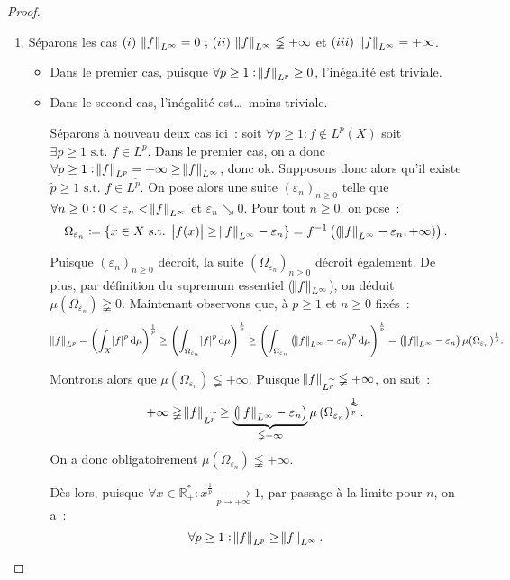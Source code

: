 \documentclass{article}
\theoremstyle{definition}
\newcommand{\pinfty}{{+\infty}}
\newcommand{\st}{\text{ s.t. }}
\newcommand{\R}{{\mathbb R}}
\begin{document}
\begin{proof}~
\begin{enumerate}
	\item Séparons les cas $(i)~\norm f_{L^\infty} = 0~; \, (ii)~\norm f_{L^\infty} \lneqq \pinfty$ et $(iii)~\norm f_{L^\infty} = \pinfty$.
	\begin{itemize}
		\item Dans le premier cas, puisque $\forall p \geq 1 : \norm f_{L^p} \geq 0$, l'inégalité est triviale.
		\item Dans le second cas, l'inégalité est\ldots~moins triviale.

		Séparons à nouveau deux cas ici~: soit $\forall p \geq 1 : f \not \in L^p(X)$ soit $\exists p \geq 1 \st f \in L^p$. Dans le premier cas, on a donc
		$\forall p \geq 1 : \norm f_{L^p} = \pinfty \geq \norm f_{L^\infty}$, donc ok. Supposons donc alors qu'il existe $\widetilde p \geq 1 \st f \in L^{\widetilde p}$.
		On pose alors une suite $(\varepsilon_n)_{n \geq 0}$ telle que $\forall n \geq 0 : 0 < \varepsilon_n < \norm f_{L^\infty}$ et $\varepsilon_n \searrow 0$.
		Pour tout $n \geq 0$, on pose~:
		\[\Omega_{\varepsilon_n} \coloneqq \{x \in X \st \abs {f(x)} \geq \norm f_{L^\infty}-\varepsilon_n\} = f^{-1}\left((\norm f_{L^\infty}-\varepsilon_n, \pinfty)\right).\]

		Puisque $(\varepsilon_n)_{n \geq 0}$ décroit, la suite $(\Omega_{\varepsilon_n})_{n \geq 0}$ décroit également. De plus, par définition du supremum essentiel ($\norm f_{L^\infty}$),
		on déduit $\mu(\Omega_{\varepsilon_n}) \gneqq 0$. Maintenant observons que, à $p \geq 1$ et $n \geq 0$ fixés~:
		\[\norm f_{L^p} = \left(\int_X\abs f^p\dif\mu\right)^{\frac 1p} \geq \left(\int_{\Omega_{\varepsilon_n}}\abs f^p\dif\mu\right)^{\frac 1p}
		\geq \left(\int_{\Omega_{\varepsilon_n}}\left(\norm f_{L^\infty}-\varepsilon_n\right)^p\dif\mu\right)^\frac 1p
		= \left(\norm f_{L^\infty}-\varepsilon_n\right)\mu(\Omega_{\varepsilon_n})^{\frac 1p}.\]

		Montrons alors que $\mu(\Omega_{\varepsilon_n}) \lneqq \pinfty$. Puisque $\norm f_{L^{\widetilde p}} \lneqq \pinfty$, on sait~:
		\[\pinfty \gneqq \norm f_{L^{\widetilde p}} \geq \underbrace {\left(\norm f_{L^\infty}-\varepsilon_n\right)}_{\lneqq \pinfty}\mu\left(\Omega_{\varepsilon_n}\right)^{\frac 1{\widetilde p}}.\]
		On a donc obligatoirement $\mu(\Omega_{\varepsilon_n}) \lneqq \pinfty$.

		Dès lors, puisque $\forall x \in \R_+^* : x^{\frac 1p} \xrightarrow[p \to \pinfty]{} 1$, par passage à la limite pour $n$, on a~:
		\[\forall p \geq 1 : \norm f_{L^p} \geq \norm f_{L^\infty}.\]


\end{itemize}
\end{enumerate}
\end{proof}
\end{document}
